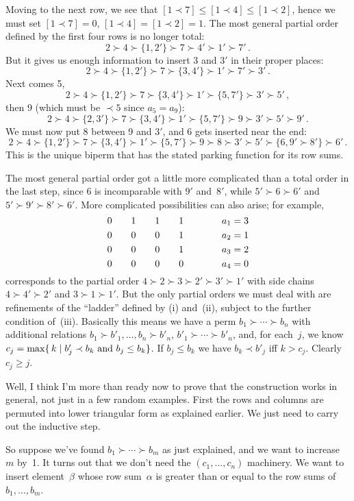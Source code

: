 Moving to the next row, we see that $[1\prec 7]\leq [1\prec 4]\leq [1\prec
2]$, hence we must set $[1\prec 7]=0$, $[1\prec 4]=[1\prec 2]=1$. The most
general partial order defined by the first four rows is no longer total:
$$2\succ 4\succ \{1,2'\}\succ 7\succ 4'\succ 1'\succ 7'\,.$$
But it gives us enough information to insert 3 and $3'$ in their proper
places:
$$2\succ 4\succ \{1,2'\}\succ 7\succ \{3,4'\}\succ 1'\succ 7'\succ 3'\,.$$
Next comes 5,
$$2\succ 4\succ \{1,2'\}\succ 7\succ \{3,4'\}\succ 1'\succ \{5,7'\}\succ
3'\succ 5'\,,$$
then 9 (which must be $\prec 5$ since $a_5=a_9$):
$$2\succ 4\succ \{2,3'\}\succ 7\succ \{3,4'\}\succ 1'\succ\{5,7'\}\succ
9\succ 3'\succ 5'\succ 9'\,.$$
We must now put 8 between 9 and $3'$, and 6 gets inserted near the end:
$$2\succ 4\succ\{1,2'\}\succ 7\succ\{3,4'\}\succ 1'\succ\{5,7'\}\succ
9\succ 8\succ 3'\succ 5'\succ\{6,9'\succ 8'\}\succ 6'\,.$$
This is the unique biperm that has the stated parking function for its row
sums.

The most general partial order got a little more complicated than a total
order in the last step, since 6 is incomparable with $9'$ and~$8'$, while
$5'\succ 6\succ 6'$ and $5'\succ 9'\succ 8'\succ 6'$. More complicated
possibilities can also arise; for example,
$$\vcenter{\halign{\hfil$#$\hfil\qquad&\hfil$#$\hfil\qquad&\hfil$#$\hfil\qquad%
&\hfil$#$\hfil\qquad\qquad&\hfil$#$\hfil\cr
0&1&1&1&a_1=3\cr
\noalign{\smallskip}
0&0&0&1&a_2=1\cr
\noalign{\smallskip}
0&0&0&1&a_3=2\cr
\noalign{\smallskip}
0&0&0&0&a_4=0\cr}}$$
corresponds to the partial order $4\succ 2\succ 3\succ 2'\succ 3'\succ 1'$
with side chains $4\succ 4'\succ 2'$ and $3\succ 1\succ 1'$. But the only
partial orders we must deal with are refinements of the ``ladder'' defined
by (i) and~(ii), subject to the further condition of~(iii). Basically this
means we have a perm $b_1\succ\cdots\succ b_n$ with additional relations 
$b_1\succ b'_1,\ldots,b_n\succ b'_n$, $b'_1\succ\cdots\succ b'_n$,
 and, for each~$j$, we know
$c_j=\max\{\,k\mid b'_j\prec b_k\ {\rm and}\ b_j\leq b_k\}$. 
If $b_j\leq b_k$ we have $b_k\prec b'_j$ iff $k>c_j$. Clearly $c_j\geq j$. 

Well, I think I'm more than ready now to prove that the construction works
in general, not just in a few random examples. First the rows and columns
are permuted into lower triangular form as explained earlier. We just need
to carry out the inductive step.

So suppose we've found $b_1\succ \cdots\succ b_m$ as just explained, and we
want to increase~$m$ by~1. It turns out that we don't need the
$(c_1,\ldots,c_n)$ machinery. We want to insert element~$\beta$ whose row
sum~$\alpha$ is greater than or equal to the row sums of $b_1,\ldots,b_m$.

